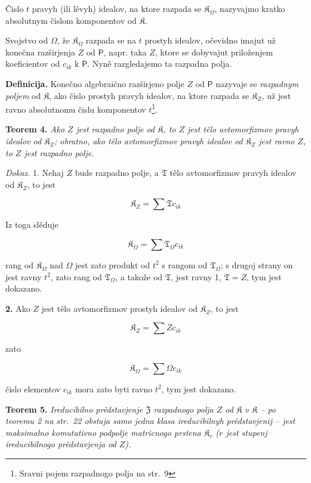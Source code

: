 \documentclass[11pt]{article}
\newcommand{\srcfn}[2]{\footnote{#2}}
\begin{document}
Čislo \(t\) pravyh (ili lěvyh) idealov, na ktore razpada se \(\mathfrak K_\Omega\), nazyvajmo kratko absolutnym čislom komponentov od \(\mathfrak K\).

Svojstvo od \(\Omega\), že \(\mathfrak K_\Omega\) razpada se na \(t\) prostyh idealov, očevidno imajut už konečna razširjenja \(Z\) od \(\mathsf P\), napr. taka \(Z\), ktore se dobyvajut priloženjem koeficientov od \(c_{ik}\) k \(\mathsf P\). Nyně razgledajemo ta razpadna polja.

\textbf{Definicija.} Konečno algebraično razširjeno polje \(Z\) od \(\mathsf P\) nazyvaje se \emph{razpadnym poljem} od \(\mathfrak K\), ako čislo prostyh pravyh idealov, na ktore razpada se \(\mathfrak K_Z\), už jest ravno absolutnomu čislu komponentov \(t\)\srcfn{1}{Sravni pojem razpadnogo polja na str.~9}.

\textbf{Teorem 4.} \emph{Ako \(Z\) jest razpadno polje od \(\mathfrak K\), to \(Z\) jest tělo avtomorfizmov pravyh idealov od \(\mathfrak K_Z\); obratno, ako tělo avtomorfizmov pravyh idealov od \(\mathfrak K_Z\) jest ravno \(Z\), to \(Z\) jest razpadno polje.}

\emph{Dokaz.} 1. Nehaj \(Z\) bude razpadno polje, a \(\mathfrak T\) tělo avtomorfizmov pravyh idealov od \(\mathfrak K_Z\), to jest

\[
\mathfrak K_Z=\sum\mathfrak T c_{ik}
\]

Iz toga slěduje

\[
\mathfrak K_\Omega=\sum\mathfrak T_\Omega c_{ik}
\]

rang od \(\mathfrak K_\Omega\) nad \(\Omega\) jest zato produkt od \(t^2\) s rangom od \(\mathfrak T_\Omega\); s drugoj strany on jest ravny \(t^2\), zato rang od \(\mathfrak T_\Omega\), a takože od \(\mathfrak T\), jest ravny 1, \(\mathfrak T=Z\), tym jest dokazano.

\textbf{2.} Ako \(Z\) jest tělo avtomorfizmov prostyh idealov od \(\mathfrak K_Z\), to jest

\[
\mathfrak K_Z=\sum Zc_{ik}
\]

zato

\[
\mathfrak K_\Omega=\sum\Omega c_{ik}
\]

čislo elementov \(c_{ik}\) mora zato byti ravno \(t^2\), tym jest dokazano.

\textbf{Teorem 5.} \emph{Ireducibilno prědstavjenje \(\mathfrak Z\) razpadnogo polja \(Z\) od \(\mathfrak K\) v \(\mathfrak K\) -- po teoremu 2 na str.~22 obstaja samo jedna klasa ireducibilnyh prědstavjenij -- jest maksimalno komutativno podpolje matricnogo prstena \(\mathfrak K_r\) (\(r\) jest stupenj ireducibilnogo prědstavjenja od \(Z\)).}
\end{document}
